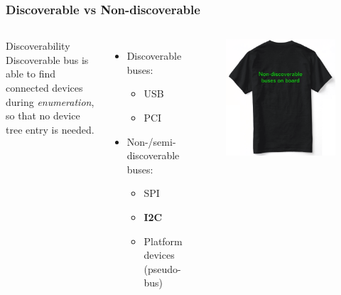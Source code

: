 \documentclass[aspectratio=169,usenames,dvipsnames]{beamer}
\begin{document}
\begin{frame}
  \frametitle{Discoverable vs Non-discoverable}
  \begin{columns}
      \begin{block}{Discoverability}
      \alert{Discoverable bus} is able to find connected devices during
      \textit{enumeration}, so that no device tree entry is needed.
      \end{block}
      \begin{itemize}
        \item Discoverable buses:
          \begin{itemize}
            \item USB
            \item PCI
          \end{itemize}
        \item Non-/semi-discoverable buses:
          \begin{itemize}
            \item SPI
            \item \textbf{I2C}
            \item Platform devices (pseudo-bus)
          \end{itemize}
      \end{itemize}
      \begin{figure}
        \centering
        \includegraphics[scale=0.25]{images/t-shirt.png}
      \end{figure}
      \vspace*{-6mm}
  \end{columns}
\end{frame}
\end{document}
